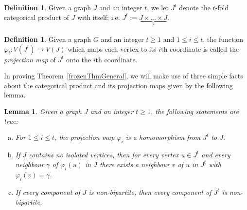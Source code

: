 \documentclass[11 pt]{amsart}
\newtheorem{lem}[equation]{Lemma}
\theoremstyle{definition}
\newtheorem{defn}[equation]{Definition}
\theoremstyle{case}
\numberwithin{equation}{section}
\begin{document}
\begin{defn}
 Given a graph $J$ and an integer $t$, we let $J^{ t}$ denote the $t$-fold categorical product of $J$ with itself; i.e. $J^{t}:=\underbrace{J\times\dots \times J}_{t}$.
\end{defn}

\begin{defn}
Given a graph $G$ and an integer $t\geq1$ and $1\leq i\leq t$, the function $\varphi_i:V(J^t)\to V(J)$ which maps each vertex to its $i$th coordinate is called the  \emph{projection map} of $J^t$ onto the $i$th coordinate.
\end{defn}

In proving Theorem~\ref{frozenThmGeneral}, we will make use of three simple facts about the categorical product and its projection maps given by the following lemma.

\begin{lem}
\label{prodLem}
Given a graph $J$ and an integer $t\geq1$, the following statements are true: 
\begin{enumerate}[(a)]
\item\label{proj} For $1\leq i\leq t$, the projection map $\varphi_i$ is a homomorphism from $J^t$ to $J$. 
\item\label{iso} If $J$ contains no isolated vertices, then for every vertex $u\in J^t$ and every neighbour $\gamma$ of $\varphi_i(u)$ in $J$ there exists a neighbour $v$ of $u$ in $J^t$ with $\varphi_i(v)=\gamma$. 
\item\label{nonbipProd} If every component of $J$ is non-bipartite, then every component of $J^t$ is non-bipartite. 
\end{enumerate}
\end{lem}
\end{document}
